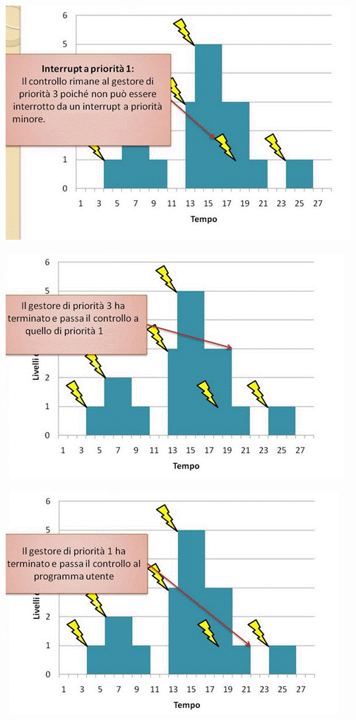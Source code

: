 \documentclass[a4paper,12pt, oneside]{book}
\begin{document}
\begin{center}
  \includegraphics[scale = 0.6]{img/int9.png}
\end{center}
\begin{center}
  \includegraphics[scale = 0.6]{img/int10.png}
\end{center}
\begin{center}
  \includegraphics[scale = 0.6]{img/int11.png}
\end{center}
\end{document}
